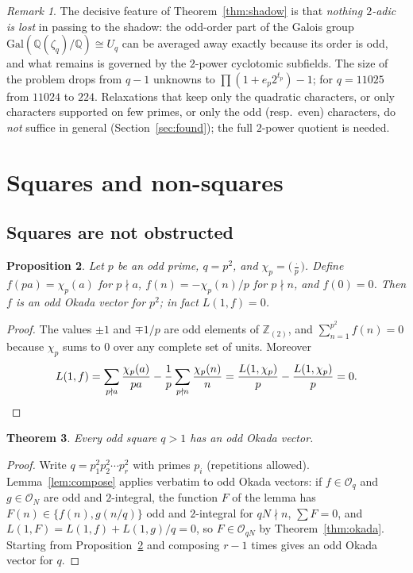 \documentclass[11pt]{amsart}
\newtheorem{theorem}{Theorem}[section]
\newtheorem{proposition}[theorem]{Proposition}
\theoremstyle{definition}
\theoremstyle{remark}
\newtheorem{remark}[theorem]{Remark}
\providecommand{\Q}{\mathbb Q}
\newcommand{\Zt}{\mathbb Z_{(2)}}
\newcommand{\Ok}{\mathcal O}
\numberwithin{equation}{section}
\begin{document}
\begin{remark}
The decisive feature of Theorem~\ref{thm:shadow} is that \emph{nothing $2$-adic is lost} in passing to the shadow: the odd-order part of the Galois group $\mathrm{Gal}(\Q(\zeta_q)/\Q)\cong U_q$ can be averaged away exactly because its order is odd, and what remains is governed by the $2$-power cyclotomic subfields.
The size of the problem drops from $q-1$ unknowns to $\prod(1+e_p2^{t_p})-1$; for $q=11025$ from $11024$ to $224$.
Relaxations that keep only the quadratic characters, or only characters supported on few primes, or only the odd (resp.\ even) characters, do \emph{not} suffice in general (Section~\ref{sec:found}); the full $2$-power quotient is needed.
\end{remark}

\section{Squares and non-squares}\label{sec:nonsquares}

\subsection{Squares are not obstructed}
\begin{proposition}\label{prop:p2}
Let $p$ be an odd prime, $q=p^2$, and $\chi_p=\bigl(\frac{\cdot}{p}\bigr)$.
Define $f(pa)=\chi_p(a)$ for $p\nmid a$, $f(n)=-\chi_p(n)/p$ for $p\nmid n$, and $f(0)=0$.
Then $f$ is an odd Okada vector for $p^2$; in fact $L(1,f)=0$.
\end{proposition}

\begin{proof}
The values $\pm1$ and $\mp1/p$ are odd elements of $\Zt$, and $\sum_{n=1}^{p^2}f(n)=0$ because $\chi_p$ sums to $0$ over any complete set of units.
Moreover
\[
L(1,f)=\sum_{p\nmid a}\frac{\chi_p(a)}{pa}-\frac1p\sum_{p\nmid n}\frac{\chi_p(n)}{n}=\frac{L(1,\chi_p)}p-\frac{L(1,\chi_p)}p=0. \qedhere
\]
\end{proof}

\begin{theorem}\label{thm:squares}
Every odd square $q>1$ has an odd Okada vector.
\end{theorem}

\begin{proof}
Write $q=p_1^2p_2^2\cdots p_r^2$ with primes $p_i$ (repetitions allowed).
Lemma~\ref{lem:compose} applies verbatim to odd Okada vectors: if $f\in\Ok_q$ and $g\in\Ok_N$ are odd and $2$-integral, the function $F$ of the lemma has $F(n)\in\{f(n),g(n/q)\}$ odd and $2$-integral for $qN\nmid n$, $\sum F=0$, and $L(1,F)=L(1,f)+L(1,g)/q=0$, so $F\in\Ok_{qN}$ by Theorem~\ref{thm:okada}.
Starting from Proposition~\ref{prop:p2} and composing $r-1$ times gives an odd Okada vector for $q$.
\end{proof}
\end{document}

